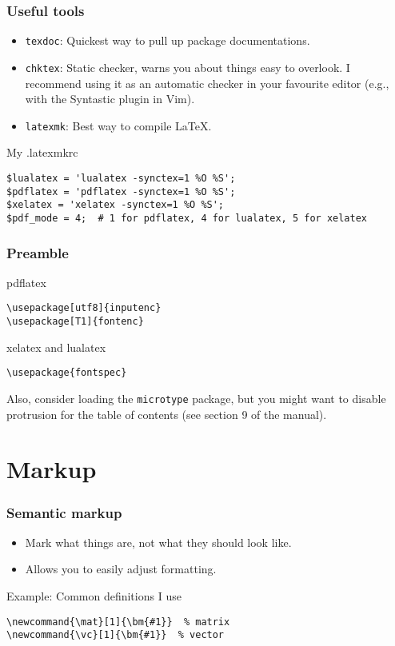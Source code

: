 \documentclass[aspectratio=1610,hyperref={colorlinks,linkcolor=}]{beamer}
\newcommand{\cmd}[1]{\texttt{#1}}
\newcommand{\pkg}[1]{\texttt{#1}}
\begin{document}
\begin{frame}[fragile]
    \frametitle{Useful tools}
    \begin{itemize}
        \item \cmd{texdoc}: Quickest way to pull up package documentations.
        \item \cmd{chktex}: Static checker, warns you about things easy to overlook. I recommend using it as an automatic checker in your favourite editor (e.g., with the Syntastic plugin in Vim).
        \item \cmd{latexmk}: Best way to compile \LaTeX.
    \end{itemize}
    \begin{beamerboxesrounded}{My .latexmkrc}  %
        \begin{verbatim}
$lualatex = 'lualatex -synctex=1 %O %S';
$pdflatex = 'pdflatex -synctex=1 %O %S';
$xelatex = 'xelatex -synctex=1 %O %S';
$pdf_mode = 4;  # 1 for pdflatex, 4 for lualatex, 5 for xelatex
        \end{verbatim}
    \end{beamerboxesrounded}
\end{frame}

\begin{frame}[fragile]
    \frametitle{Preamble}
    \begin{beamerboxesrounded}{pdflatex}
        \begin{verbatim}
\usepackage[utf8]{inputenc}
\usepackage[T1]{fontenc}
        \end{verbatim}
    \end{beamerboxesrounded}
    \begin{beamerboxesrounded}{xelatex and lualatex}
        \begin{verbatim}
\usepackage{fontspec}
        \end{verbatim}
    \end{beamerboxesrounded}
    Also, consider loading the \pkg{microtype} package, but you might want to disable protrusion for the table of contents (see section 9 of the manual).
\end{frame}

\section{Markup}
\begin{frame}[fragile]
    \frametitle{Semantic markup}
    \begin{itemize}
        \item Mark what things are, not what they should look like.
        \item Allows you to easily adjust formatting.
    \end{itemize}
    \begin{beamerboxesrounded}{Example: Common definitions I use}
        \begin{verbatim}
\newcommand{\mat}[1]{\bm{#1}}  % matrix
\newcommand{\vc}[1]{\bm{#1}}  % vector
        \end{verbatim}
    \end{beamerboxesrounded}
\end{frame}
\end{document}
